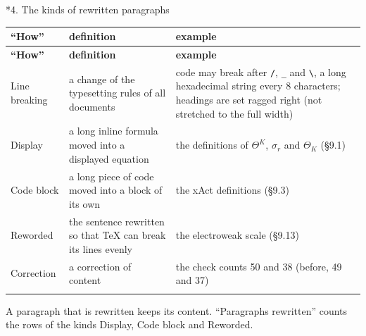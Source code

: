 \documentclass[10pt,a4paper]{article}
\makeatletter
\renewcommand\section{\@startsection{section}{1}{\z@}{-3.5ex \@plus -1ex \@minus -.2ex}{2.3ex \@plus.2ex}{\normalfont\Large\bfseries\raggedright}}
\makeatother
\begin{document}
\section*{4. The kinds of rewritten paragraphs}
{\footnotesize
\begin{longtable}{>{\raggedright\arraybackslash}p{}>{\raggedright\arraybackslash}p{}>{\raggedright\arraybackslash}p{}}
\toprule
\textbf{“How”} & \textbf{definition} & \textbf{example} \\
\midrule\endfirsthead
\toprule
\textbf{“How”} & \textbf{definition} & \textbf{example} \\
\midrule\endhead
\endfoot
\bottomrule\endlastfoot
Line breaking & a change of the typesetting rules of all documents & code may break after \texttt{/\allowbreak{}}, \texttt{\_\allowbreak{}} and \texttt{\textbackslash{}\allowbreak{}}, a long hexadecimal string every 8 characters; headings are set ragged right (not stretched to the full width) \\
Display & a long inline formula moved into a displayed equation & the definitions of $\Theta^K$, $\sigma_r$ and $\Theta_K$ (§9.1) \\
Code block & a long piece of code moved into a block of its own & the xAct definitions (§9.3) \\
Reworded & the sentence rewritten so that TeX can break its lines evenly & the electroweak scale (§9.13) \\
Correction & a correction of content & the check counts 50 and 38 (before, 49 and 37) \\*
\end{longtable}}
A paragraph that is rewritten keeps its content. “Paragraphs rewritten” counts the rows of the kinds Display, Code block and Reworded.
\end{document}
